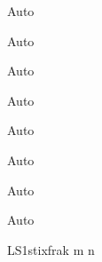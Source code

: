 \newcommand{\DeclareAutoPairedDelimiter}[3]{
	\expandafter\DeclarePairedDelimiter\csname Auto\string#1\endcsname{#2}{#3}
	\DeclareRobustCommand{#1}{\csname Auto\string#1\endcsname*}}

\DeclareAutoPairedDelimiter{\paren}{ ( }{ ) }			%
\DeclareAutoPairedDelimiter{\bracket}{ [ }{ ] }			%
\DeclareAutoPairedDelimiter{\curly}{ \{ }{ \} }			%
\DeclareAutoPairedDelimiter{\abs}{|}{|}					%
\DeclareAutoPairedDelimiter{\norm}{\|}{\|}				%
\DeclareAutoPairedDelimiter{\ip}{\langle}{\rangle}		%
\DeclareAutoPairedDelimiter{\ceil}{\lceil}{\rceil} 		%
\DeclareAutoPairedDelimiter{\floor}{\lfloor}{\rfloor} 	%

\newcommand{\nada}{\varnothing} %
\newcommand{\C}{\mathbb{C}}		%
\newcommand{\F}{\mathbb{F}}		%
\newcommand{\N}{\mathbb{N}}		%
\renewcommand{\P}{\mathbb{P}}		%
\newcommand{\Q}{\mathbb{Q}}		%
\newcommand{\R}{\mathbb{R}}		%
\newcommand{\Z}{\mathbb{Z}}		%


      {LS1}{stixfrak} {m} {n}
\newcommand{\subseto}{\mathop{\,\subsetocirc\,}}

\newcommand\inv{^{-1}} %

\newcommand{\ii}{\mathfrak{i}} 	%
\renewcommand\Re{\text{Re}\,}
\renewcommand\Im{\text{Im}\,}

